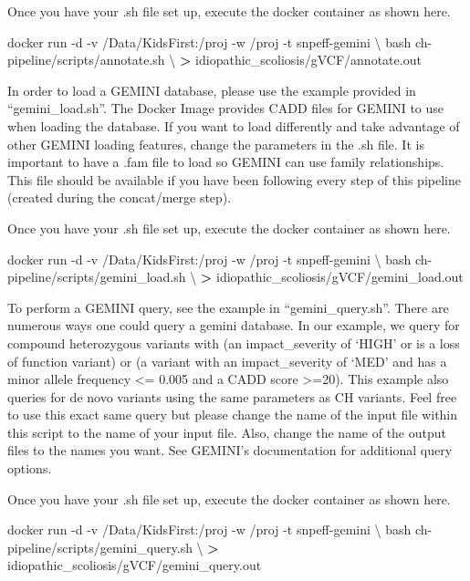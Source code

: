 \documentclass[]{article}
\newenvironment{Shaded}{\begin{snugshade}}{\end{snugshade}}
\newcommand{\ExtensionTok}[1]{#1}
\newcommand{\NormalTok}[1]{#1}
\newcommand{\OperatorTok}[1]{\textcolor[rgb]{0.81,0.36,0.00}{\textbf{#1}}}
\begin{document}
Once you have your .sh file set up, execute the docker container as
shown here.

\begin{Shaded}
\begin{Highlighting}[]
\ExtensionTok{docker}\NormalTok{ run -d -v /Data/KidsFirst:/proj -w /proj -t snpeff-gemini \textbackslash{}}
\NormalTok{  bash ch-pipeline/scripts/annotate.sh \textbackslash{}}
  \OperatorTok{>}\NormalTok{ idiopathic_scoliosis/gVCF/annotate.out}
\end{Highlighting}
\end{Shaded}

In order to load a GEMINI database, please use the example provided in
``gemini\_load.sh''. The Docker Image provides CADD files for GEMINI to
use when loading the database. If you want to load differently and take
advantage of other GEMINI loading features, change the parameters in the
.sh file. It is important to have a .fam file to load so GEMINI can use
family relationships. This file should be available if you have been
following every step of this pipeline (created during the concat/merge
step).

Once you have your .sh file set up, execute the docker container as
shown here.

\begin{Shaded}
\begin{Highlighting}[]
\ExtensionTok{docker}\NormalTok{ run -d -v /Data/KidsFirst:/proj -w /proj -t snpeff-gemini \textbackslash{}}
\NormalTok{  bash ch-pipeline/scripts/gemini_load.sh \textbackslash{}}
  \OperatorTok{>}\NormalTok{ idiopathic_scoliosis/gVCF/gemini_load.out}
\end{Highlighting}
\end{Shaded}

To perform a GEMINI query, see the example in ``gemini\_query.sh''.
There are numerous ways one could query a gemini database. In our
example, we query for compound heterozygous variants with (an
impact\_severity of `HIGH' or is a loss of function variant) or (a
variant with an impact\_severity of `MED' and has a minor allele
frequency \textless{}= 0.005 and a CADD score \textgreater{}=20). This
example also queries for de novo variants using the same parameters as
CH variants. Feel free to use this exact same query but please change
the name of the input file within this script to the name of your input
file. Also, change the name of the output files to the names you want.
See GEMINI's documentation for additional query options.

Once you have your .sh file set up, execute the docker container as
shown here.

\begin{Shaded}
\begin{Highlighting}[]
\ExtensionTok{docker}\NormalTok{ run -d -v /Data/KidsFirst:/proj -w /proj -t snpeff-gemini \textbackslash{}}
\NormalTok{  bash ch-pipeline/scripts/gemini_query.sh \textbackslash{}}
  \OperatorTok{>}\NormalTok{ idiopathic_scoliosis/gVCF/gemini_query.out}
\end{Highlighting}
\end{Shaded}
\end{document}
